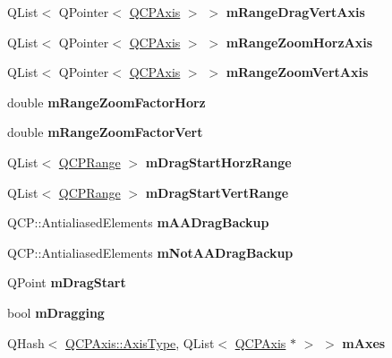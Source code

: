 \begin{DoxyCompactItemize}
Q\+List$<$ Q\+Pointer$<$ \hyperlink{class_q_c_p_axis}{Q\+C\+P\+Axis} $>$ $>$ {\bfseries m\+Range\+Drag\+Vert\+Axis}
\item 
\mbox{\label{class_q_c_p_axis_rect_aa35eeb02f68b63f2069fcc80c9334b91}} 
Q\+List$<$ Q\+Pointer$<$ \hyperlink{class_q_c_p_axis}{Q\+C\+P\+Axis} $>$ $>$ {\bfseries m\+Range\+Zoom\+Horz\+Axis}
\item 
\mbox{\label{class_q_c_p_axis_rect_aafb0e243294c158668499fd62cee057c}} 
Q\+List$<$ Q\+Pointer$<$ \hyperlink{class_q_c_p_axis}{Q\+C\+P\+Axis} $>$ $>$ {\bfseries m\+Range\+Zoom\+Vert\+Axis}
\item 
\mbox{\label{class_q_c_p_axis_rect_ad08d0250ed7b99de387d0ea6c7fd4dc1}} 
double {\bfseries m\+Range\+Zoom\+Factor\+Horz}
\item 
\mbox{\label{class_q_c_p_axis_rect_a32f063629581d5bf82b12769940b34ad}} 
double {\bfseries m\+Range\+Zoom\+Factor\+Vert}
\item 
\mbox{\label{class_q_c_p_axis_rect_a274aef08c4de084a3f26c3e92fac3a79}} 
Q\+List$<$ \hyperlink{class_q_c_p_range}{Q\+C\+P\+Range} $>$ {\bfseries m\+Drag\+Start\+Horz\+Range}
\item 
\mbox{\label{class_q_c_p_axis_rect_ab362ee8f71a156d812a1ea793a1e42cb}} 
Q\+List$<$ \hyperlink{class_q_c_p_range}{Q\+C\+P\+Range} $>$ {\bfseries m\+Drag\+Start\+Vert\+Range}
\item 
\mbox{\label{class_q_c_p_axis_rect_aa4a24f76360cfebe1bcf17a77fa7521b}} 
Q\+C\+P\+::\+Antialiased\+Elements {\bfseries m\+A\+A\+Drag\+Backup}
\item 
\mbox{\label{class_q_c_p_axis_rect_a6fcb12e052e276d57efbb128be31d6f5}} 
Q\+C\+P\+::\+Antialiased\+Elements {\bfseries m\+Not\+A\+A\+Drag\+Backup}
\item 
\mbox{\label{class_q_c_p_axis_rect_a032896b28f83a58010d8d533b78c49df}} 
Q\+Point {\bfseries m\+Drag\+Start}
\item 
\mbox{\label{class_q_c_p_axis_rect_ab49a6698194cf0e9e38a1d734c0888a8}} 
bool {\bfseries m\+Dragging}
\item 
\mbox{\label{class_q_c_p_axis_rect_afe7a24d2a2bea98fc552fa826350ba81}} 
Q\+Hash$<$ \hyperlink{class_q_c_p_axis_ae2bcc1728b382f10f064612b368bc18a}{Q\+C\+P\+Axis\+::\+Axis\+Type}, Q\+List$<$ \hyperlink{class_q_c_p_axis}{Q\+C\+P\+Axis} $\ast$ $>$ $>$ {\bfseries m\+Axes}
\end{DoxyCompactItemize}
